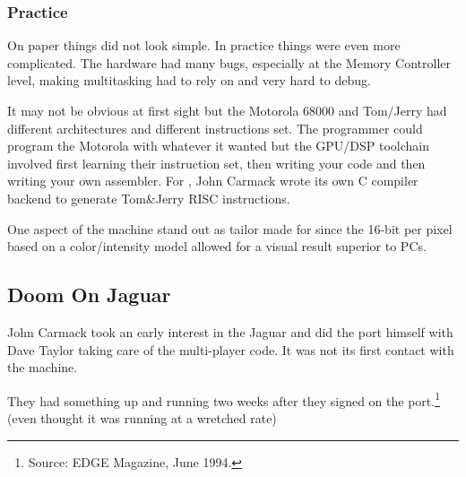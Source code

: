 \subsubsection{Practice}
On paper things did not look simple. In practice things were even more complicated. The hardware had many bugs, especially at the Memory Controller level, making multitasking had to rely on and very hard to debug.\\
\par
It may not be obvious at first sight but the Motorola 68000 and Tom/Jerry had different architectures and different instructions set. The programmer could program the Motorola with whatever it wanted but the GPU/DSP toolchain involved first learning their instruction set, then writing your code and then writing your own assembler. For \doom, John Carmack wrote its own C compiler backend to generate Tom\&Jerry RISC instructions.\\
\par
One aspect of the machine stand out as tailor made for \doom since the 16-bit per pixel based on a color/intensity model allowed for a visual result superior to PCs.\\
\par











\subsection{Doom On Jaguar}
John Carmack took an early interest in the Jaguar and did the port himself with Dave Taylor taking care of the multi-player code. It was not its first contact with the machine.\\
\par
{}
\par
They had something up and running two weeks after they signed on the port.\footnote{Source: EDGE Magazine, June 1994.} (even thought it was running at a wretched rate)


